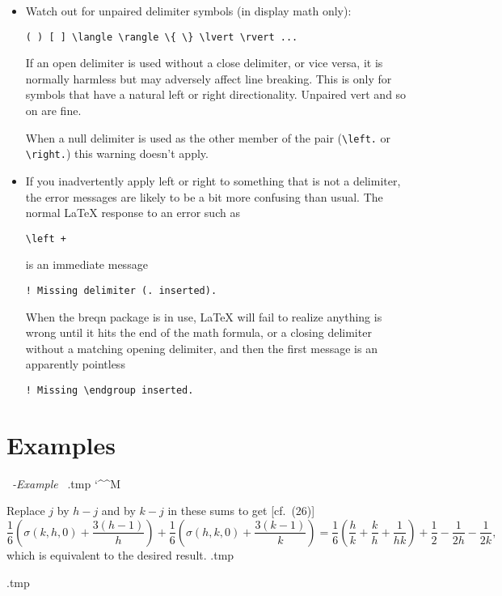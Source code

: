 \documentclass{article}
\makeatletter
\newcounter{xio}
\newenvironment{xio}{%
  \par\addvspace\bigskipamount
  \hbox{\itshape 
    \refstepcounter{xio}\kern-\p@ Example \thexio}\@nobreaktrue
  \immediate\openout\tmp@out\jobname.tmp \relax
  \begingroup
  \let\do\@makeother\dospecials\catcode`\^^M\active
  \def\verbatim@processline{%
    \immediate\write\tmp@out{\the\verbatim@line}}%
  \verbatim@start
}{%
  \immediate\closeout\tmp@out
  \@verbatim\frenchspacing\@vobeyspaces
  \@@input \jobname.tmp \relax
  \endgroup
  \par\medskip
  \noindent\ignorespaces
  \@@input \jobname.tmp \relax
  \par\medskip
}
\def\latex/{{\protect\LaTeX}}
\newcommand{\ntt}{\normalfont\ttfamily}
\DeclareRobustCommand{\cs}[1]{{\ntt\ttbackslash#1}}
\let\cn=\cs
\DeclareRobustCommand{\pkg}[1]{{\ntt#1}}
\newcommand\thepkg[1]{the \pkg{breqn} package}
\makeatother
\begin{document}
\begin{itemize}
\item Watch out for unpaired delimiter symbols (in display math only):
\begin{verbatim}
( ) [ ] \langle \rangle \{ \} \lvert \rvert ...
\end{verbatim}
If an open delimiter is used without a close delimiter, or vice versa,
it is normally harmless but may adversely affect line breaking. This is only
for symbols that have a natural left or right directionality. Unpaired
\cn{vert} and so on are fine.

When a null delimiter is used as the other member of the pair
(\verb'\left.' or \verb'\right.') this warning doesn't apply.

\item If you inadvertently apply \cn{left} or \cn{right} to something
that is not a delimiter, the error messages are likely to be a bit
more confusing than usual. The normal \latex/ response to an error such
as
\begin{verbatim}
\left +
\end{verbatim}
is an immediate message
\begin{verbatim}
! Missing delimiter (. inserted).
\end{verbatim}
When \thepkg/ is in use, \latex/ will fail to realize anything is wrong
until it hits the end of the math formula, or a closing delimiter
without a matching opening delimiter, and then the first message is an
apparently pointless
\begin{verbatim}
! Missing \endgroup inserted.
\end{verbatim}

\end{itemize}

\section{Examples}

\renewcommand\theequation{\thesection.\arabic{equation}}
\begin{xio}
Replace $j$ by $h-j$ and by $k-j$ in these sums to get [cf.~(26)]
\begin{dmath}[label={sna74}]
\frac{1}{6} \left(\sigma(k,h,0) +\frac{3(h-1)}{h}\right)
  +\frac{1}{6} \left(\sigma(h,k,0) +\frac{3(k-1)}{k}\right)
=\frac{1}{6} \left(\frac{h}{k} +\frac{k}{h} +\frac{1}{hk}\right)
  +\frac{1}{2} -\frac{1}{2h} -\frac{1}{2k},
\end{dmath}
which is equivalent to the desired result.
\end{xio}
\end{document}
